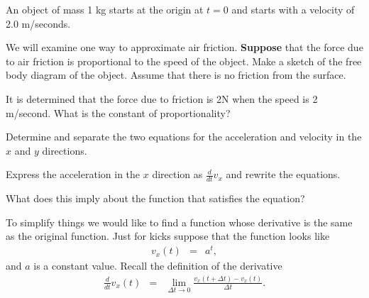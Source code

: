 \begin{problem}
\item An object of mass 1 kg starts at the origin at $t=0$ and starts
  with a velocity of 2.0 m/seconds.
  \begin{subproblem}
  \item We will examine one way to approximate air friction.
    \textbf{Suppose} that the force due to air friction is
    proportional to the speed of the object.  Make a sketch of the
    free body diagram of the object. Assume that there is no friction
    from the surface.

    \vfill

  \item It is determined that the force due to friction is 2N when the
    speed is 2 m/second. What is the constant of proportionality? 

    \vspace{4em}

  \item Determine and separate the two equations for the acceleration
    and velocity in the $x$ and $y$ directions.

    \vfill

  \item Express the acceleration in the $x$ direction as $\frac{d}{dt}
    v_x$ and rewrite the equations.
    \vspace{4em}

  \item What does this imply about the function that satisfies the
    equation?

    \vspace{4em}

  \end{subproblem}

  \clearpage

\item To simplify things we would like to find a function whose
  derivative is the same as the original function. Just for kicks
  suppose that the function looks like
  \begin{eqnarray*}
    v_x(t) & = & a^t,
  \end{eqnarray*}
  and $a$ is a constant value. Recall the definition of the derivative
  \begin{eqnarray*}
    \frac{d}{dt} v_x(t) & = & \lim_{\Delta t \rightarrow 0}
                              \frac{v_x(t+\Delta t) - v_x(t)}{\Delta t}.
  \end{eqnarray*}


\end{problem}

